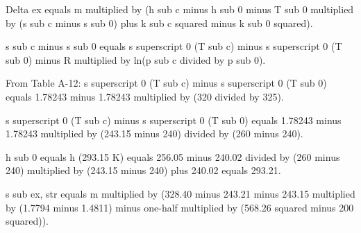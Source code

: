 Delta ex equals m multiplied by (h sub c minus h sub 0 minus T sub 0 multiplied by (s sub c minus s sub 0) plus k sub c squared minus k sub 0 squared).  

s sub c minus s sub 0 equals s superscript 0 (T sub c) minus s superscript 0 (T sub 0) minus R multiplied by ln(p sub c divided by p sub 0).  

From Table A-12:  
s superscript 0 (T sub c) minus s superscript 0 (T sub 0) equals 1.78243 minus 1.78243 multiplied by (320 divided by 325).  

s superscript 0 (T sub c) minus s superscript 0 (T sub 0) equals 1.78243 minus 1.78243 multiplied by (243.15 minus 240) divided by (260 minus 240).  

h sub 0 equals h (293.15 K) equals 256.05 minus 240.02 divided by (260 minus 240) multiplied by (243.15 minus 240) plus 240.02 equals 293.21.  

s sub ex, str equals m multiplied by (328.40 minus 243.21 minus 243.15 multiplied by (1.7794 minus 1.4811) minus one-half multiplied by (568.26 squared minus 200 squared)).